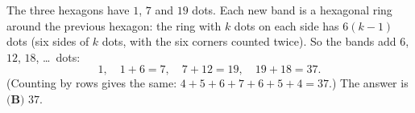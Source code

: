 The three hexagons have $1$, $7$ and $19$ dots. Each new band is a hexagonal ring around the previous hexagon: the ring with $k$ dots on each side has $6(k-1)$ dots (six sides of $k$ dots, with the six corners counted twice). So the bands add $6$, $12$, $18$, \dots\ dots:
\[1,\quad1+6=7,\quad7+12=19,\quad19+18=37.\]
(Counting by rows gives the same: $4+5+6+7+6+5+4=37$.) The answer is $\boxed{\textbf{(B) }37}$.
